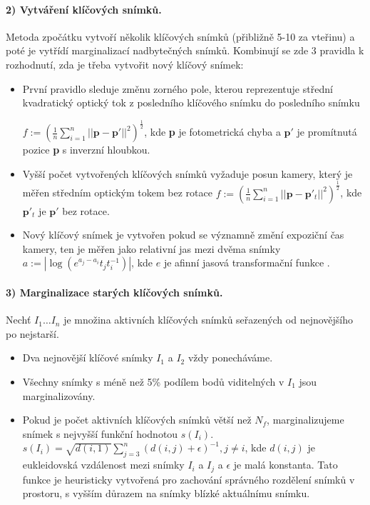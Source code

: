 \documentclass[12pt,a4paper]{article}
\begin{document}
\paragraph*{2) Vytváření klíčových snímků.} Metoda zpočátku vytvoří několik klíčových snímků (přibližně 5-10 za vteřinu) a poté je vytřídí marginalizací nadbytečných snímků. Kombinují se zde 3 pravidla k rozhodnutí, zda je třeba vytvořit nový klíčový snímek:
\begin{itemize}
\item První pravidlo sleduje změnu zorného pole, kterou reprezentuje střední kvadratický optický tok z posledního klíčového snímku do posledního snímku
 
\( f:=(\frac{1}{n}\sum_{i=1}^n||\textbf{p}-\textbf{p}'||^2)^\frac{1}{2} \), kde \textbf{p} je fotometrická chyba a \(\textbf{p}'\) je promítnutá pozice \textbf{p} s inverzní hloubkou.

\item Vyšší počet vytvořených klíčových snímků vyžaduje posun kamery, který je měřen středním optickým tokem bez rotace \( f:=(\frac{1}{n}\sum_{i=1}^n||\textbf{p}-\textbf{p}'_t||^2)^\frac{1}{2} \), kde \(\textbf{p}'_t\) je \(\textbf{p}'\) bez rotace.

\item Nový klíčový snímek je vytvořen pokud se významně změní expoziční čas kamery, ten je měřen jako relativní jas mezi dvěma snímky \( a:=|\log(e^{a_j-a_i} t_j t_i^{-1})| \), kde \( e \) je afinní jasová transformační funkce \cite{Engel2018_DSO}.
\end{itemize}


\paragraph*{3) Marginalizace starých klíčových snímků.} Nechť \( I_1 \dots I_n \) je množina aktivních klíčových snímků seřazených od nejnovějšího po nejstarší.
\begin{itemize}
\item Dva nejnovější klíčové snímky \( I_1 \) a \( I_2 \) vždy ponecháváme.
\item Všechny snímky s méně než 5\% podílem bodů viditelných v \( I_1 \) jsou marginalizovány.
\item Pokud je počet aktivních klíčových snímků větší než \( N_f \), marginalizujeme snímek s nejvyšší funkční hodnotou \( s(I_i) \). \( s(I_i)=\sqrt{d(i,1)} \sum_{j=3}^n (d(i,j)+\epsilon)^{-1}, j\neq i \), kde \( d(i,j) \) je eukleidovská vzdálenost mezi snímky \( I_i \) a \( I_j \) a \( \epsilon \) je  malá konstanta. Tato funkce je heuristicky vytvořená pro zachování správného rozdělení snímků v prostoru, s vyšším důrazem na snímky blízké aktuálnímu snímku.
\end{itemize}
\end{document}
